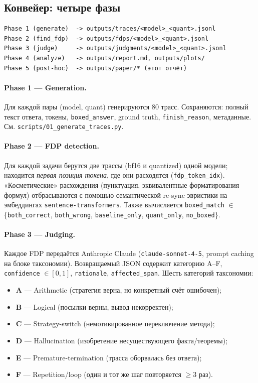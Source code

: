 \documentclass[11pt, a4paper]{article}
\newcommand{\code}[1]{\texttt{#1}}
\begin{document}
\subsection{Конвейер: четыре фазы}

\begin{lstlisting}
Phase 1 (generate)  -> outputs/traces/<model>_<quant>.jsonl
Phase 2 (find_fdp)  -> outputs/fdps/<model>_<quant>.jsonl
Phase 3 (judge)     -> outputs/judgments/<model>_<quant>.jsonl
Phase 4 (analyze)   -> outputs/report.md, outputs/plots/
Phase 5 (post-hoc)  -> outputs/paper/* (этот отчёт)
\end{lstlisting}

\paragraph{Phase 1 --- Generation.} Для каждой пары (model, quant)
генерируются $80$ трасс. Сохраняются: полный текст ответа, токены,
\code{boxed\_answer}, ground truth, \code{finish\_reason}, метаданные.
См. \code{scripts/01\_generate\_traces.py}.

\paragraph{Phase 2 --- FDP detection.} Для каждой задачи берутся две
трассы (bf16 и quantized) одной модели; находится \emph{первая позиция
токена}, где они расходятся (\code{fdp\_token\_idx}). «Косметические»
расхождения (пунктуация, эквивалентные форматирования формул)
отбрасываются с помощью семантической re-sync эвристики на эмбеддингах
\code{sentence-transformers}. Также вычисляется
\code{boxed\_match} $\in$
\{\code{both\_correct}, \code{both\_wrong}, \code{baseline\_only},
\code{quant\_only}, \code{no\_boxed}\}.

\paragraph{Phase 3 --- Judging.} Каждое FDP передаётся Anthropic Claude
(\code{claude-sonnet-4-5}, prompt caching на блоке таксономии).
Возвращаемый JSON содержит категорию A--F, \code{confidence} $\in [0,1]$,
\code{rationale}, \code{affected\_span}. Шесть категорий таксономии:

\begin{itemize}[leftmargin=*, itemsep=0pt]
\item \textbf{A} --- Arithmetic (стратегия верна, но конкретный счёт ошибочен);
\item \textbf{B} --- Logical (посылки верны, вывод некорректен);
\item \textbf{C} --- Strategy-switch (немотивированное переключение метода);
\item \textbf{D} --- Hallucination (изобретение несуществующего факта/теоремы);
\item \textbf{E} --- Premature-termination (трасса оборвалась без ответа);
\item \textbf{F} --- Repetition/loop (один и тот же шаг повторяется $\geq 3$ раз).
\end{itemize}
\end{document}
